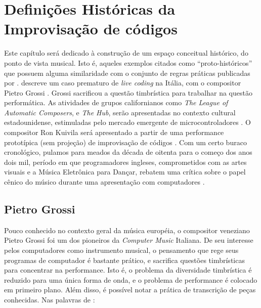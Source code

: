 \chapter{Definições Históricas da Improvisação de códigos}\label{sec:protohistoria}

Este capítulo será dedicado à construção de um espaço conceitual histórico, do ponto de vista musical. Isto é, aqueles exemplos citados como ``proto-históricos'' que possuem alguma similaridade com o conjunto de regras práticas publicadas por  .  descreve um caso prematuro de \emph{live coding} na Itália, com o compositor Pietro Grossi . Grossi sacrificou a questão timbrística para trabalhar na questão performática. As atividades de grupos californianos como \emph{The League of Automatic Composers}, e \emph{The Hub}, serão apresentadas no contexto cultural estadounidense, estimuladas pelo mercado emergente de microcontroladores . O compositor Ron Kuivila será apresentado a partir de uma performance prototípica (sem projeção) de improvisação de códigos . Com um certo buraco cronológico, pulamos para meados da década de oitenta para o começo dos anos dois mil, período em que programadores ingleses,  comprometidos com as artes visuais e a Música Eletrônica para Dançar, rebatem uma crítica sobre o papel cênico do músico durante uma apresentação com computadores . 


\section{Pietro Grossi}\label{sec:grossi}

Pouco conhecido no contexto geral da música européia, o compositor veneziano Pietro Grossi foi  um dos pioneiros da \emph{Computer Music} Italiana. De seu interesse pelos computadores como instrumento musical, o pensamento que rege seus programas de computador é bastante prático, e sacrifica questões timbrísticas para concentrar na performance. Isto é, o problema da diversidade timbrística é reduzido para uma única forma de onda, e o problema de performance é colocado em primeiro plano. Além disso, é possível notar a prática de transcrição de peças conhecidas. Nas palavras de :

